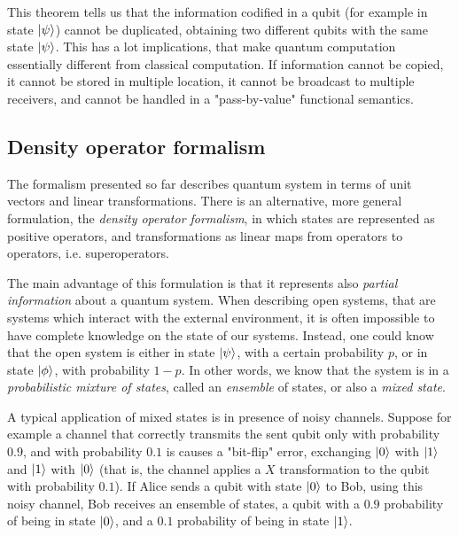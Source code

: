 This theorem tells us that the information codified in a qubit (for example in state $\ket{\psi}$) cannot be duplicated, obtaining two different qubits with the same state $\ket{\psi}$. This has a lot implications, that make quantum computation essentially different from classical computation. If information cannot be copied, it cannot be stored in multiple location, it cannot be broadcast to multiple receivers, and cannot be handled in a "pass-by-value" functional semantics. 

\subsection{Density operator formalism}

The formalism presented so far describes quantum system in terms of unit vectors and linear transformations. There is an alternative, more general formulation, the \textit{density operator formalism}, in which states are represented as positive operators, and transformations as linear maps from operators to operators, i.e. superoperators.

The main advantage of this formulation is that it represents also \textit{partial information} about a quantum system. When describing open systems, that are systems which interact with the external environment, it is often impossible to have complete knowledge on the state of our systems. Instead, one could know that the open system is either in state $\ket{\psi}$, with a certain probability $p$, or in state $\ket{\phi}$, with probability $1-p$. In other words, we know that the system is in a \textit{probabilistic mixture of states}, called an \textit{ensemble} of states, or also a \textit{mixed state}.

A typical application of mixed states is in presence of noisy channels. Suppose for example a channel that correctly transmits the sent qubit only with probability $0.9$, and with probability $0.1$ is causes a "bit-flip" error, exchanging $\ket{0}$ with $\ket{1}$ and $\ket{1}$ with $\ket{0}$ (that is, the channel applies a $X$ transformation to the qubit with probability $0.1$). If Alice sends a qubit with state $\ket{0}$ to Bob, using this noisy channel, Bob receives an ensemble of states, a qubit with a $0.9$ probability of being in state $\ket{0}$, and a $0.1$ probability of being in state $\ket{1}$.


